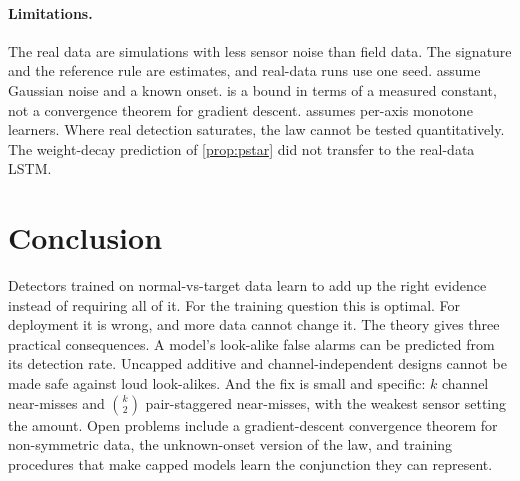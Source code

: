 \documentclass{article}
\theoremstyle{definition}
\theoremstyle{remark}
\renewcommand{\1}{\mathbf{1}}
\begin{document}
\paragraph{Limitations.} The real data are simulations with less sensor noise than field data. The signature and the reference rule are estimates, and real-data runs use one seed.  assume Gaussian noise and a known onset.  is a bound in terms of a measured constant, not a convergence theorem for gradient descent.  assumes per-axis monotone learners. Where real detection saturates, the law cannot be tested quantitatively. The weight-decay prediction of \cref{prop:pstar} did not transfer to the real-data LSTM.

\section{Conclusion}
\label{sec:conclusion}
Detectors trained on normal-vs-target data learn to add up the right evidence instead of requiring all of it. For the training question this is optimal. For deployment it is wrong, and more data cannot change it. The theory gives three practical consequences. A model's look-alike false alarms can be predicted from its detection rate. Uncapped additive and channel-independent designs cannot be made safe against loud look-alikes. And the fix is small and specific: $k$ channel near-misses and $\binom k2$ pair-staggered near-misses, with the weakest sensor setting the amount. Open problems include a gradient-descent convergence theorem for non-symmetric data, the unknown-onset version of the law, and training procedures that make capped models learn the conjunction they can represent.




\newpage
\appendix

\end{document}
